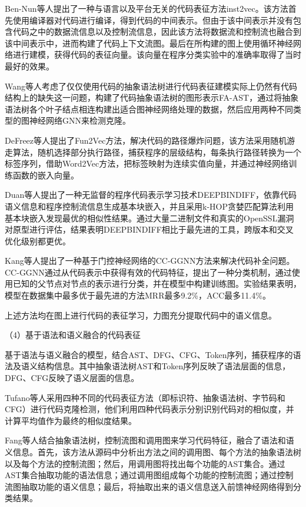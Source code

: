 Ben-Nun等人\cite{10.5555/3327144.3327276}提出了一种与语言以及平台无关的代码表征方法inst2vec。该方法首先使用编译器对代码进行编译，得到代码的中间表示。但由于该中间表示并没有包含代码之中的数据流信息以及控制流信息，因此该方法将数据流和控制流也融合到该中间表示中，进而构建了代码上下文流图。最后在所构建的图上使用循环神经网络进行建模，获得代码的表征向量。该向量在程序分类实验中的准确率取得了当时最好的效果。

Wang等人\cite{9054857}考虑了仅仅使用代码的抽象语法树进行代码表征建模实际上仍然有代码结构上的缺失这一问题，构建了代码抽象语法树的图形表示FA-AST，通过将抽象语法树各个叶子结点相连构建出适合图神经网络处理的数据，然后应用两种不同类型的图神经网络GNN来检测克隆。

DeFreez等人\cite{10.1145/3236024.3236059}提出了Fun2Vec方法，解决代码的路径爆炸问题，该方法采用随机游走算法，随机选择部分执行路径，捕获程序的层级结构，每条执行路径转换为一个标签序列，借助Word2Vec方法，把标签映射为连续实值向量，并通过神经网络训练函数的嵌入向量。

Duan等人\cite{WOS:000680742600067}提出了一种无监督的程序代码表示学习技术DEEPBINDIFF，依靠代码语义信息和程序控制流信息生成基本块嵌入，并且采用k-HOP贪婪匹配算法利用基本块嵌入发现最优的相似性结果。通过大量二进制文件和真实的OpenSSL漏洞对原型进行评估，结果表明DEEPBINDIFF相比于最先进的工具，跨版本和交叉优化级别都更优。

Kang等人\cite{Yang2021AGS}提出了一种基于门控神经网络的CC-GGNN方法来解决代码补全问题。CC-GGNN通过从代码表示中获得有效的代码特征，提出了一种分类机制，通过使用已知的父节点对节点的表示进行分类，并在模型中构建训练图。实验结果表明，模型在数据集中最多优于最先进的方法MRR最多9.2\%，ACC最多11.4\%。

上述方法均在图上进行代码的表征学习，力图充分提取代码中的语义信息。

（4）基于语法和语义融合的代码表征

基于语法与语义融合的模型，结合AST、DFG、CFG、Token序列，捕获程序的语法及语义结构信息。其中抽象语法树AST和Token序列反映了语法层面的信息，DFG、CFG反映了语义层面的信息。

Tufano等人\cite{Tufano2018DeepLS}采用四种不同的代码表征方法（即标识符、抽象语法树、字节码和CFG）进行代码克隆检测，他们利用四种代码表示分别识别代码对的相似度，并计算平均值作为最终的相似度结果。

Fang等人\cite{Fang2020FunctionalCC}结合抽象语法树，控制流图和调用图来学习代码特征，融合了语法和语义信息。首先，该方法从源码中分析出方法之间的调用图、每个方法的抽象语法树以及每个方法的控制流图；然后，用调用图将找出每个功能的AST集合。通过AST集合抽取功能的语法信息；通过调用图组成每个功能的控制流图；通过控制流图抽取功能的语义信息；最后，将抽取出来的语义信息送入前馈神经网络得到分类结果。

